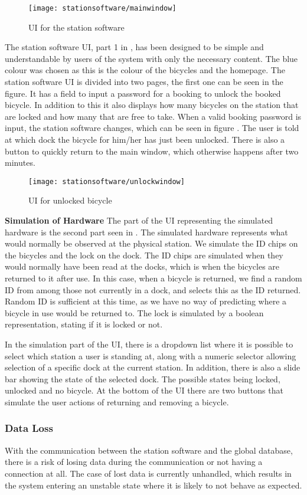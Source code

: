 \begin{figure}
	\centering
	\texttt{[image: stationsoftware/mainwindow]}
	\caption{UI for the station software}\label{fig:stationMain}
\end{figure}

The station software UI, part 1 in , has been designed to be simple and understandable by users of the system with only the necessary content.
The blue colour was chosen as this is the colour of the bicycles and the \bycykel homepage.
The station software UI is divided into two pages, the first one can be seen in the figure.
It has a field to input a password for a booking to unlock the booked bicycle.
In addition to this it also displays how many bicycles on the station that are locked and how many that are free to take.
When a valid booking password is input, the station software changes, which can be seen in figure .
The user is told at which dock the bicycle for him/her has just been unlocked.
There is also a button to quickly return to the main window, which otherwise happens after two minutes.

\begin{figure}
	\centering
	\texttt{[image: stationsoftware/unlockwindow]}
	\caption{UI for unlocked bicycle}\label{fig:bicycleUnlock}
\end{figure}

\textbf{Simulation of Hardware}
The part of the UI representing the simulated hardware is the second part seen in .
The simulated hardware represents what would normally be observed at the physical station.
We simulate the ID chips on the bicycles and the lock on the dock.
The ID chips are simulated when they would normally have been read at the docks, which is when the bicycles are returned to it after use.
In this case, when a bicycle is returned, we find a random ID from among those not currently in a dock, and selects this as the ID returned.
Random ID is sufficient at this time, as we have no way of predicting where a bicycle in use would be returned to.
The lock is simulated by a boolean representation, stating if it is locked or not.

In the simulation part of the UI, there is a dropdown list where it is possible to select which station a user is standing at, along with a numeric selector allowing selection of a specific dock at the current station.
In addition, there is also a slide bar showing the state of the selected dock.
The possible states being locked, unlocked and no bicycle.
At the bottom of the UI there are two buttons that simulate the user actions of returning and removing a bicycle.

\subsubsection{Data Loss}
With the communication between the station software and the global database, there is a risk of losing data during the communication or not having a connection at all.
The case of lost data is currently unhandled, which results in the system entering an unstable state where it is likely to not behave as expected. 

